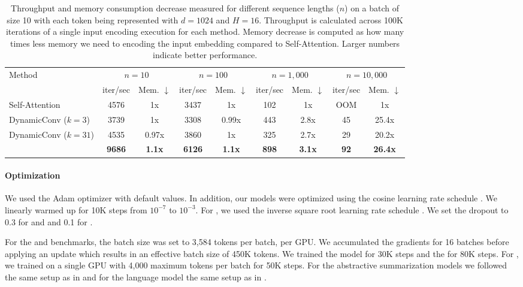 \documentclass{article}
\begin{document}
\begin{table}
\centering
\caption{Throughput and memory consumption decrease measured for different sequence lengths ($n$) on a batch of size 10 with each token being represented with $d=1024$ and $H=16$. Throughput is calculated across 100K iterations of a single input encoding execution for each method. Memory decrease is computed as how many times less memory we need to encoding the input embedding compared to Self-Attention. Larger numbers indicate better performance.}
\vskip 0.15in
\begin{tabular}{l|cc|cc|cc|cc}
\toprule
\multirow{2}{*}{Method} & \multicolumn{2}{c|}{$n=10$} & \multicolumn{2}{c|}{$n=100$} & \multicolumn{2}{c|}{$n=1,000$} & \multicolumn{2}{c}{$n=10,000$} \\
\cline{2-9}
& iter/sec & Mem. $\downarrow$ & iter/sec  & Mem. $\downarrow$ & iter/sec  & Mem. $\downarrow$ & iter/sec & Mem. $\downarrow$ \\ \midrule
Self-Attention & 4576 & 1x & 3437 & 1x & 102 & 1x & OOM & 1x \\
DynamicConv ($k=3$) & 3739 & 1x & 3308 & 0.99x & 443 & 2.8x & 45 & 25.4x \\
DynamicConv ($k=31$) & 4535 & 0.97x & 3860 & 1x & 325 & 2.7x & 29 & 20.2x \\
\midrule
\talkconvfull{} & \textbf{9686} & \textbf{1.1x} & \textbf{6126} & \textbf{1.1x} & \textbf{898} & \textbf{3.1x} & \textbf{92} & \textbf{26.4x} \\
\bottomrule
\end{tabular}
\label{tab:time_mem_table}
\end{table}

\paragraph{Optimization} We used the Adam optimizer \cite{kingma2014adam} with default values. In addition, our models were optimized using the cosine learning rate schedule \cite{loshchilov2016sgdr}. We linearly warmed up for 10K steps from $10^{-7}$ to $10^{-3}$. For \iwslt{}, we used the inverse square root learning rate schedule \cite{vaswani2017attention}. We set the dropout to 0.3 for \ende{} and \iwslt{} and 0.1 for \enfr{}.

For the \ende{} and \enfr{} benchmarks, the batch size was set to 3,584 tokens per batch, per GPU. We accumulated the gradients for 16 batches before applying an update which results in an effective batch size of 450K tokens. We trained the \ende{} model for 30K steps and the \enfr{} for 80K steps. For \iwslt{}, we trained on a single GPU with 4,000 maximum tokens per batch  for 50K steps. For the abstractive summarization models we followed the same setup as in \citet{wu2019pay} and for the language model the same setup as in \citet{DBLP:journals/corr/abs-1809-10853}.
    
\end{document}
